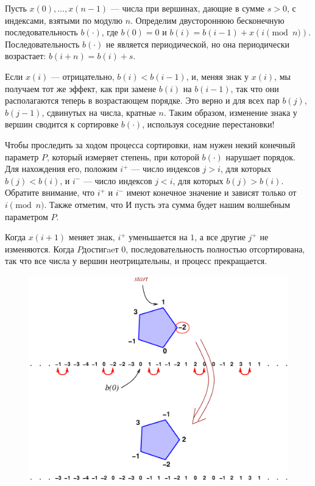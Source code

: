 \medskip

Пусть $x(0),\dots,x(n-1)$ --- числа при вершинах, дающие в сумме $s > 0$, с индексами, взятыми по модулю $n$.
Определим двустороннюю бесконечную последовательность
$b(\cdot)$, где $b(0) = 0$ и $b(i) = b(i -1) + x(i \pmod{n})$.
Последовательность $b(\cdot)$ не является периодической, но она периодически возрастает: $b(i + n) = b(i) + s$.

Если $x(i)$ --- отрицательно, $b(i) < b(i-1)$, и, меняя знак у $x(i)$, мы получаем тот же эффект, как при замене $b(i)$ на $b(i - 1)$, так что они располагаются теперь в возрастающем порядке.
Это верно и для всех пар $b(j)$, $b(j - 1)$, сдвинутых на числа, кратные $n$.
Таким образом, изменение знака у вершин сводится к сортировке $b(\cdot)$, используя соседние перестановки!

Чтобы проследить за ходом процесса сортировки, нам нужен некий конечный параметр $P$, который измеряет степень, при которой $b(\cdot)$ нарушает порядок. %
Для нахождения его, положим $i^+$ --- число индексов $j > i$, для которых $b(j) < b(i)$, и $i^-$ --- число индексов $j < i$, для которых $b(j) > b(i)$.
Обратите внимание, что $i^+$ и $i^-$ имеют конечное значение и зависят только от $i \pmod n$.
Также отметим, что И пусть эта сумма будет нашим волшебным параметром $P$.

Когда $x(i+1)$ меняет знак, $i^+$ уменьшается на $1$, а все другие $j^+$ не изменяются.
Когда $P $достигaeт $0$, последовательность полностью отсортирована, так что все числа у вершин неотрицательны, и процесс прекращается.

\begin{figure}[h!]
\centering
\includegraphics[scale=0.5]{Figs/Algorithms/sort}
\end{figure}

